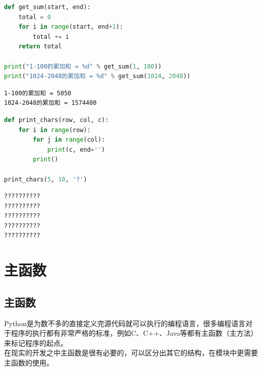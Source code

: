 \vspace{0.5cm}


\begin{lstlisting}[language=Python]
def get_sum(start, end):
    total = 0
    for i in range(start, end+1):
        total += i
    return total

print("1-100的累加和 = %d" % get_sum(1, 100))
print("1024-2048的累加和 = %d" % get_sum(1024, 2048))
\end{lstlisting}

\begin{tcolorbox}
	\begin{verbatim}
1-100的累加和 = 5050
1024-2048的累加和 = 1574400
\end{verbatim}
\end{tcolorbox}

\vspace{0.5cm}


\begin{lstlisting}[language=Python]
def print_chars(row, col, c):
    for i in range(row):
        for j in range(col):
            print(c, end='')
        print()

print_chars(5, 10, '?')
\end{lstlisting}

\begin{tcolorbox}
	\begin{verbatim}
??????????
??????????
??????????
??????????
??????????
\end{verbatim}
\end{tcolorbox}

\newpage

\section{主函数}

\subsection{主函数}

Python是为数不多的直接定义完源代码就可以执行的编程语言，很多编程语言对于程序的执行都有非常严格的标准，例如C、C++、Java等都有主函数（主方法）来标记程序的起点。\\

在现实的开发之中主函数是很有必要的，可以区分出其它的结构，在模块中更需要主函数的使用。\\

